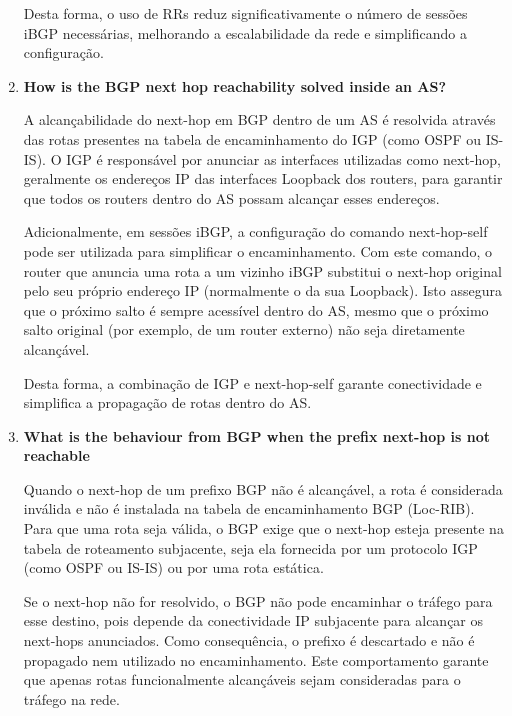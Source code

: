 \documentclass[11pt,english, openright, oneside]{book}
\begin{document}
\begin{enumerate}
  Desta forma, o uso de RRs reduz significativamente o número de sessões iBGP necessárias, melhorando a escalabilidade da rede e simplificando a configuração.
  \vspace{0.2cm}

  \item \textbf{How is the BGP next hop reachability solved inside an AS?} 
  \vspace{0.2cm}

  A alcançabilidade do next-hop em BGP dentro de um AS é resolvida através das rotas presentes na tabela de encaminhamento do IGP (como OSPF ou IS-IS). O IGP é responsável por anunciar as interfaces utilizadas como next-hop, geralmente os endereços IP das interfaces Loopback dos routers, para garantir que todos os routers dentro do AS possam alcançar esses endereços.

  Adicionalmente, em sessões iBGP, a configuração do comando next-hop-self pode ser utilizada para simplificar o encaminhamento. Com este comando, o router que anuncia uma rota a um vizinho iBGP substitui o next-hop original pelo seu próprio endereço IP (normalmente o da sua Loopback). Isto assegura que o próximo salto é sempre acessível dentro do AS, mesmo que o próximo salto original (por exemplo, de um router externo) não seja diretamente alcançável.

  Desta forma, a combinação de IGP e next-hop-self garante conectividade e simplifica a propagação de rotas dentro do AS.
  \vspace{0.2cm}

  \item \textbf{What is the behaviour from BGP when the prefix next-hop is not reachable} 
  \vspace{0.2cm}

  Quando o next-hop de um prefixo BGP não é alcançável, a rota é considerada inválida e não é instalada na tabela de encaminhamento BGP (Loc-RIB). Para que uma rota seja válida, o BGP exige que o next-hop esteja presente na tabela de roteamento subjacente, seja ela fornecida por um protocolo IGP (como OSPF ou IS-IS) ou por uma rota estática.

  Se o next-hop não for resolvido, o BGP não pode encaminhar o tráfego para esse destino, pois depende da conectividade IP subjacente para alcançar os next-hops anunciados. Como consequência, o prefixo é descartado e não é propagado nem utilizado no encaminhamento. Este comportamento garante que apenas rotas funcionalmente alcançáveis sejam consideradas para o tráfego na rede.


\end{enumerate}
\end{document}
